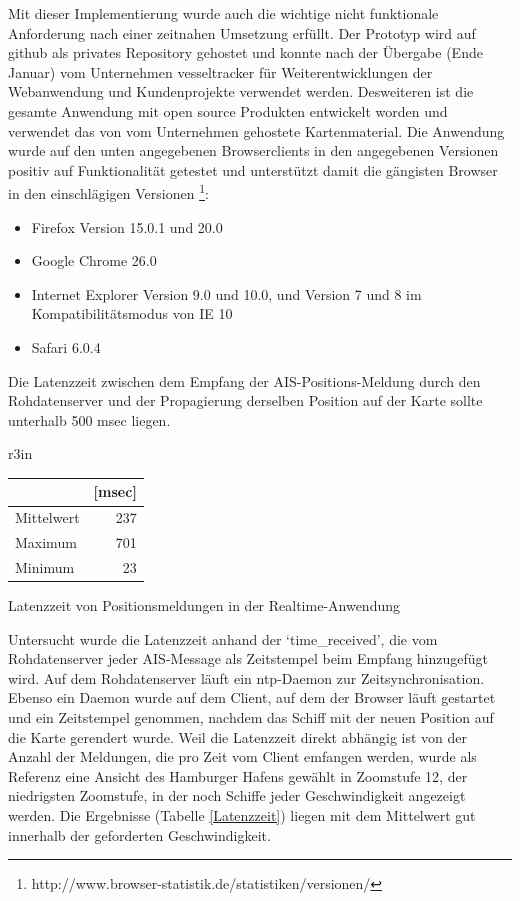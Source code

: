 Mit dieser Implementierung wurde auch die wichtige nicht funktionale Anforderung nach einer zeitnahen Umsetzung erfüllt. Der Prototyp wird auf github als privates Repository gehostet und konnte nach der Übergabe (Ende Januar) vom Unternehmen vesseltracker für Weiterentwicklungen der Webanwendung und Kundenprojekte verwendet werden. 
Desweiteren ist die gesamte Anwendung mit open source Produkten entwickelt worden und verwendet das von vom Unternehmen gehostete Kartenmaterial.\newline
Die Anwendung wurde auf den unten angegebenen Browserclients in den angegebenen Versionen positiv auf Funktionalität getestet und unterstützt damit die gängisten Browser in den einschlägigen Versionen \footnote{http://www.browser-statistik.de/statistiken/versionen/}:
\begin{itemize}
\item Firefox Version 15.0.1 und 20.0
\item Google Chrome 26.0
\item Internet Explorer Version 9.0 und 10.0, und Version 7 und 8 im Kompatibilitätsmodus von IE 10
\item Safari 6.0.4
\end {itemize}

Die Latenzzeit zwischen dem Empfang der AIS-Positions-Meldung durch den Rohdatenserver und der Propagierung derselben Position auf der Karte sollte unterhalb 500 msec liegen. 
\begin {wraptable}{r}{3in}
\begin{center}
\begin{tabular}{| l|r|}\hline
& [msec]\\\hline
Mittelwert & 237 \\
Maximum & 701\\
Minimum & 23\\\hline
\end{tabular}
\caption[Latenzzeit von Positionsmeldungen in der RealtimeAnwendung]{Latenzzeit von Positionsmeldungen in der Realtime-Anwendung}
\label{Latenzeit_RealtimeApp}
\end{center}
 \end {wraptable}
Untersucht wurde die Latenzzeit anhand der ‘time\_received’, die vom Rohdatenserver jeder AIS-Message als Zeitstempel beim Empfang hinzugefügt wird. Auf dem Rohdatenserver läuft ein ntp-Daemon zur Zeitsynchronisation. Ebenso ein Daemon wurde auf dem Client, auf dem der Browser läuft gestartet und ein Zeitstempel genommen, nachdem das Schiff mit der neuen Position auf die Karte gerendert wurde. Weil die Latenzzeit direkt abhängig ist von der Anzahl der Meldungen, die pro Zeit vom Client emfangen werden, wurde als Referenz eine Ansicht des Hamburger Hafens gewählt in Zoomstufe 12, der niedrigsten Zoomstufe, in der noch Schiffe jeder Geschwindigkeit angezeigt werden. Die Ergebnisse (Tabelle \ref{Latenzzeit}) liegen mit dem Mittelwert gut innerhalb der geforderten Geschwindigkeit.

